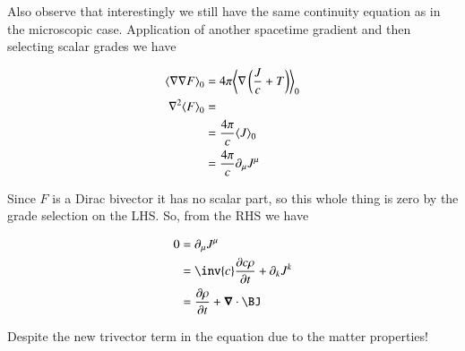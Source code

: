 Also observe that interestingly we still have the same continuity equation as in the microscopic case.  Application of another spacetime gradient and then selecting scalar grades we have

\begin{align*}
{\left\langle{{ \nabla\nabla F }}\right\rangle}_{0} &= 4 \pi {\left\langle{{ \nabla\left( \frac{J}{c} + T \right) }}\right\rangle}_{0}  \\
\nabla^2 {\left\langle{{ F }}\right\rangle}_{0} &= \\
&= \frac{ 4 \pi }{c} {\left\langle{{ J }}\right\rangle}_{0} \\
&= \frac{ 4 \pi }{c} \partial_\mu J^\mu \\
\end{align*}

Since $F$ is a Dirac bivector it has no scalar part, so this whole thing is zero by the grade selection on the LHS.  So, from the RHS we have

\begin{align*}
0 &= \partial_\mu J^\mu \\
&= \inv{c} \PD{t}{c\rho} + \partial_k J^k \\
&= \PD{t}{\rho} + \spacegrad \cdot \BJ
\end{align*}

Despite the new trivector term in the equation due to the matter properties!

